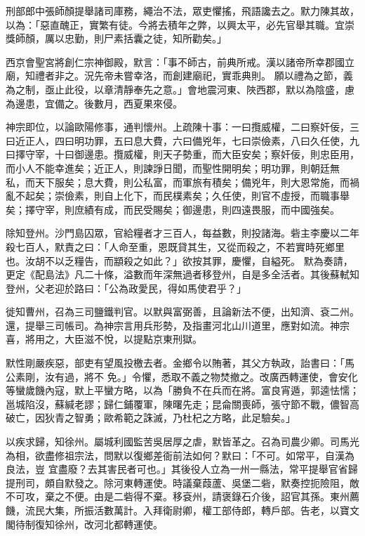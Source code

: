 \begin{pinyinscope}
 刑部郎中張師顏提舉諸司庫務，繩治不法，眾吏懼搖，飛語讒去之。默力陳其故，以為：「惡直醜正，實繁有徒。今將去積年之弊，以興太平，必先官舉其職。宜崇獎師顏，厲以忠勤，則尸素括囊之徒，知所勸矣。」



 西京會聖宮將創仁宗神御殿，默言：「事不師古，前典所戒。漢以諸帝所幸郡國立廟，知禮者非之。況先帝未嘗幸洛，而創建廟祀，實乖典則。
 願以禮為之節，義為之制，亟止此役，以章清靜奉先之意。」會地震河東、陜西郡，默以為陰盛，慮為邊患，宜備之。後數月，西夏果來侵。



 神宗即位，以論歐陽修事，通判懷州。上疏陳十事：一曰攬威權，二曰察奸佞，三曰近正人，四曰明功罪，五曰息大費，六曰備兇年，七曰崇儉素，八曰久任使，九曰擇守宰，十曰御邊患。攬威權，則天子勢重，而大臣安矣；察奸佞，則忠臣用，而小人不能幸進矣；近正人，則諫諍日聞，而聖性開明矣；明功罪，則朝廷無
 私，而天下服矣；息大費，則公私富，而軍旅有積矣；備兇年，則大恩常施，而禍亂不起矣；崇儉素，則自上化下，而民樸素矣；久任使，則官不虛授，而職事舉矣；擇守宰，則庶績有成，而民受賜矣；御邊患，則四遠畏服，而中國強矣。



 除知登州。沙門島囚眾，官給糧者才三百人，每益數，則投諸海。砦主李慶以二年殺七百人，默責之曰：「人命至重，恩既貸其生，又從而殺之，不若實時死鄉里也。汝胡不以乏糧告，而顓殺之如此？」欲按其罪，慶懼，自縊死。
 默為奏請，更定《配島法》凡二十條，溢數而年深無過者移登州，自是多全活者。其後蘇軾知登州，父老迎於路曰：「公為政愛民，得如馬使君乎？」



 徙知曹州，召為三司鹽鐵判官。以默與富弼善，且論新法不便，出知濟、袞二州。還，提舉三司帳司。為神宗言用兵形勢，及指畫河北山川道里，應對如流。神宗喜，將用之，大臣滋不悅，以提點京東刑獄。



 默性剛嚴疾惡，部吏有望風投檄去者。金鄉令以賄著，其父方執政，詒書曰：「馬公素剛，汝有過，將不
 免。」令懼，悉取不義之物焚撤之。改廣西轉運使，會安化等蠻歲饑內寇，默上平蠻方略，以為「勝負不在兵而在將。富良宵遁，郭逵怯懦；邕城陷沒，蘇緘老謬；歸仁鋪覆軍，陳曙先走；昆侖關喪師，張守節不戰，儂智高破亡，因狄青之智勇；歐希範之誅滅，乃杜杞之方略，此足驗矣。」



 以疾求歸，知徐州。屬城利國監苦吳居厚之虐，默皆革之。召為司農少卿。司馬光為相，欲盡修祖宗法，問默以復鄉差衙前法如何？默曰：「不可。如常平，自漢為良法，豈
 宜盡廢？去其害民者可也。」其後役人立為一州一縣法，常平提舉官省歸提刑司，頗自默發之。除河東轉運使。時議棄葭蘆、吳堡二砦，默奏控扼險阻，敵不可攻，棄之不便。由是二砦得不棄。移袞州，請褒錄石介後，詔官其孫。東州薦饑，流民大集，所振活數萬計。入拜衛尉卿，權工部侍郎，轉戶部。告老，以寶文閣待制復知徐州，改河北都轉運使。




\end{pinyinscope}
